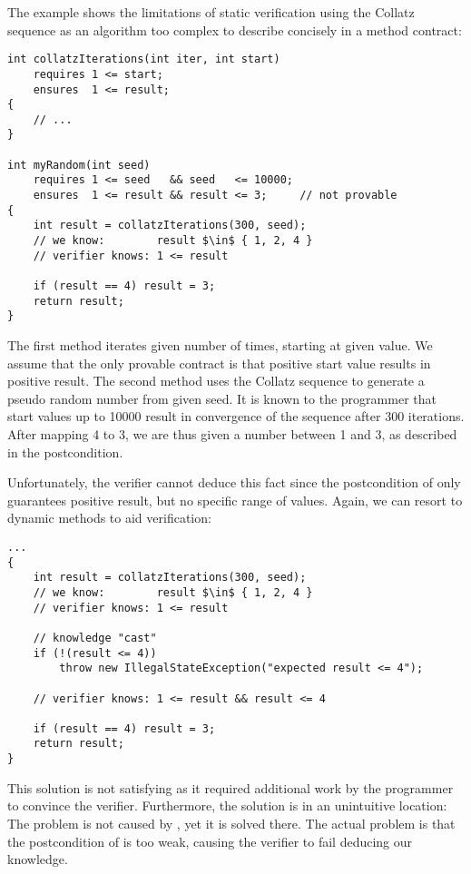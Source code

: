 The example shows the limitations of static verification using the Collatz sequence as an algorithm too complex to describe concisely in a method contract:
\begin{lstlisting}
int collatzIterations(int iter, int start)
    requires 1 <= start;
    ensures  1 <= result;
{
    // ...
}

int myRandom(int seed)
    requires 1 <= seed   && seed   <= 10000;
    ensures  1 <= result && result <= 3;     // not provable
{
    int result = collatzIterations(300, seed);
    // we know:        result $\in$ { 1, 2, 4 }
    // verifier knows: 1 <= result
    
    if (result == 4) result = 3;
    return result;
}
\end{lstlisting}
The first method  iterates given number of times, starting at given value.
We assume that the only provable contract is that positive start value results in positive result.
The second method  uses the Collatz sequence to generate a pseudo random number from given seed.
It is known to the programmer that start values up to 10000 result in convergence of the sequence after 300 iterations.
After mapping 4 to 3, we are thus given a number between 1 and 3, as described in the postcondition.

Unfortunately, the verifier cannot deduce this fact since the postcondition of  only guarantees positive result, but no specific range of values.
Again, we can resort to dynamic methods to aid verification:

\begin{lstlisting}
...
{
    int result = collatzIterations(300, seed);
    // we know:        result $\in$ { 1, 2, 4 }
    // verifier knows: 1 <= result
    
    // knowledge "cast"
    if (!(result <= 4))
        throw new IllegalStateException("expected result <= 4");

    // verifier knows: 1 <= result && result <= 4 
    
    if (result == 4) result = 3;
    return result;
}
\end{lstlisting}

This solution is not satisfying as it required additional work by the programmer to convince the verifier.
Furthermore, the solution is in an unintuitive location:
The problem is not caused by , yet it is solved there.
The actual problem is that the postcondition of  is too weak, causing the verifier to fail deducing our knowledge.

